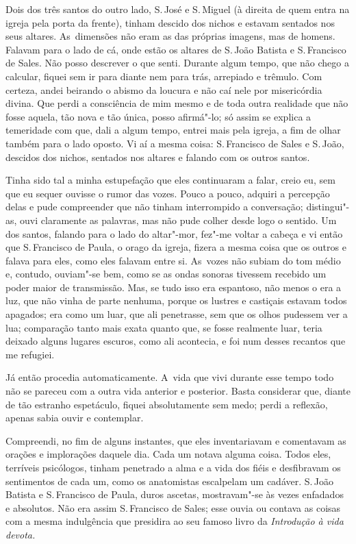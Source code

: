 \begin{linenumbers}
Dois dos três santos do outro lado, S.\,José e S.\,Miguel (à direita de
quem entra na igreja pela porta da frente), tinham descido dos nichos e
estavam sentados nos seus altares. As~dimensões não eram as das próprias
imagens, mas de homens. Falavam para o lado de cá, onde estão os altares
de S.\,João Batista e S.\,Francisco de Sales. Não posso descrever o que
senti. Durante algum tempo, que não chego a calcular, fiquei sem ir para
diante nem para trás, arrepiado e trêmulo. Com certeza, andei beirando o
abismo da loucura e não caí nele por misericórdia divina. Que perdi a
consciência de mim mesmo e de toda outra realidade que não fosse aquela,
tão nova e tão única, posso afirmá"-lo; só assim se explica a temeridade
com que, dali a algum tempo, entrei mais pela igreja, a fim de olhar
também para o lado oposto. Vi aí a mesma coisa: S.\,Francisco de Sales e
S.\,João, descidos dos nichos, sentados nos altares e falando com os
outros santos.

Tinha sido tal a minha estupefação que eles continuaram a falar, creio
eu, sem que eu sequer ouvisse o rumor das vozes. Pouco a pouco, adquiri
a percepção delas e pude compreender que não tinham interrompido a
conversação; distingui"-as, ouvi claramente as palavras, mas não pude
colher desde logo o sentido. Um dos santos, falando para o lado do
altar"-mor, fez"-me voltar a cabeça e vi então que S.\,Francisco de Paula,
o orago da igreja, fizera a mesma coisa que os outros e falava para
eles, como eles falavam entre si. As~vozes não subiam do tom médio e,
contudo, ouviam"-se bem, como se as ondas sonoras tivessem recebido um
poder maior de transmissão. Mas, se tudo isso era espantoso, não menos o
era a luz, que não vinha de parte nenhuma, porque os lustres e castiçais
estavam todos apagados; era como um luar, que ali penetrasse, sem que os
olhos pudessem ver a lua; comparação tanto mais exata quanto que, se
fosse realmente luar, teria deixado alguns lugares escuros, como ali
acontecia, e foi num desses recantos que me refugiei.

Já então procedia automaticamente. A~vida que vivi durante esse tempo
todo não se pareceu com a outra vida anterior e posterior. Basta
considerar que, diante de tão estranho espetáculo, fiquei absolutamente
sem medo; perdi a reflexão, apenas sabia ouvir e contemplar.

Compreendi, no fim de alguns instantes, que eles inventariavam e
comentavam as orações e implorações daquele dia. Cada um notava alguma
coisa. Todos eles, terríveis psicólogos, tinham penetrado a alma e a
vida dos fiéis e desfibravam os sentimentos de cada um, como os
anatomistas escalpelam um cadáver. S.\,João Batista e S.\,Francisco de
Paula, duros ascetas, mostravam"-se às vezes enfadados e absolutos. Não
era assim S.\,Francisco de Sales; esse ouvia ou contava as coisas com a
mesma indulgência que presidira ao seu famoso livro da \emph{Introdução
à vida devota.}


\end{linenumbers}
